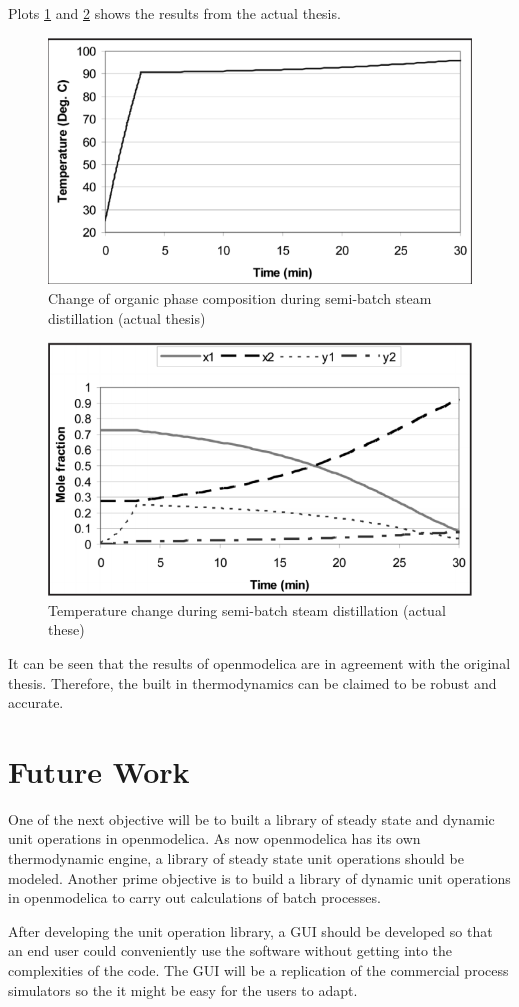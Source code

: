 \documentclass[12pt]{report}
\begin{document}
Plots \ref{SD3} and \ref{SD4} shows the results from the actual thesis.
\begin{figure}
\centering
\includegraphics[width=0.7\linewidth]{SD3}
\caption{Change of organic phase composition during semi-batch steam distillation (actual thesis)}
\label{SD3}
\end{figure}
\begin{figure}
\centering
\includegraphics[width=0.7\linewidth]{SD4}
\caption{Temperature change during semi-batch steam distillation (actual these)}
\label{SD4}
\end{figure}

It can be seen that the results of openmodelica are in agreement with the original thesis. Therefore, the built in thermodynamics can be claimed to be robust and accurate.

\chapter{Future Work}
One of the next objective will be to built a library of steady state and dynamic unit operations in openmodelica. As now openmodelica has its own thermodynamic engine, a library of steady state unit operations should be modeled. Another prime objective is to build a library of dynamic unit operations in openmodelica to carry out calculations of batch processes.

After developing the unit operation library, a GUI should be developed so that an end user could conveniently use the software without getting into the complexities of the code. The GUI will be a replication of the commercial process simulators so the it might be easy for the users to adapt.
\end{document}
